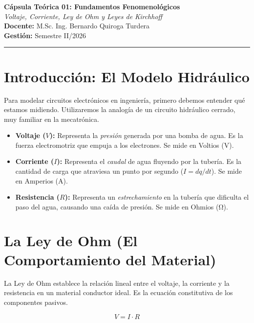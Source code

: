 \documentclass[11pt, a4paper]{article}
\begin{document}
\begin{center}
    \vspace*{0.5cm}
    {\LARGE \textbf{Cápsula Teórica 01: Fundamentos Fenomenológicos}} \\[0.3cm]
    {\Large \textit{Voltaje, Corriente, Ley de Ohm y Leyes de Kirchhoff}} \\[0.8cm]
    \normalsize
    \textbf{Docente:} M.Sc. Ing. Bernardo Quiroga Turdera \\
    \textbf{Gestión:} Semestre II/2026
    \vspace{0.5cm}
\end{center}

\hrule
\vspace{0.7cm}

\section{Introducción: El Modelo Hidráulico}
Para modelar circuitos electrónicos en ingeniería, primero debemos entender qué estamos midiendo. Utilizaremos la analogía de un circuito hidráulico cerrado, muy familiar en la mecatrónica.

\begin{itemize}[label=\textcolor{ucbblue}{\textbullet}]
    \item \textbf{Voltaje ($V$):} Representa la \textit{presión} generada por una bomba de agua. Es la fuerza electromotriz que empuja a los electrones. Se mide en Voltios (\unit{\volt}).
    \item \textbf{Corriente ($I$):} Representa el \textit{caudal} de agua fluyendo por la tubería. Es la cantidad de carga que atraviesa un punto por segundo ($I = dq/dt$). Se mide en Amperios (\unit{\ampere}).
    \item \textbf{Resistencia ($R$):} Representa un \textit{estrechamiento} en la tubería que dificulta el paso del agua, causando una caída de presión. Se mide en Ohmios (\unit{\ohm}).
\end{itemize}

\section{La Ley de Ohm (El Comportamiento del Material)}
La Ley de Ohm establece la relación lineal entre el voltaje, la corriente y la resistencia en un material conductor ideal. Es la ecuación constitutiva de los componentes pasivos.

\begin{equation}
    V = I \cdot R
\end{equation}
\end{document}
